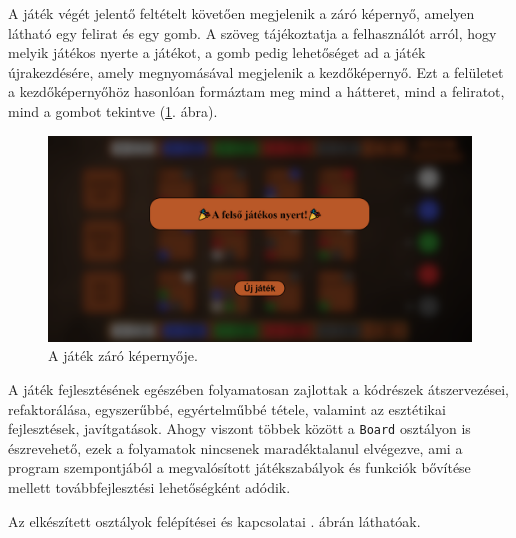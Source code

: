 
A játék végét jelentő feltételt követően megjelenik a záró képernyő, amelyen látható egy felirat és egy gomb. A szöveg tájékoztatja a felhasználót arról, hogy melyik játékos nyerte a játékot, a gomb pedig lehetőséget ad a játék újrakezdésére, amely megnyomásával megjelenik a kezdőképernyő. Ezt a felületet a kezdőképernyőhöz hasonlóan formáztam meg mind a hátteret, mind a feliratot, mind a gombot tekintve (\ref{fig:end_screen}. ábra).

\begin{figure}[h!]
\centering
\includegraphics[width=\textwidth]{images/end_screen.png}
\caption{A játék záró képernyője.}
\label{fig:end_screen}
\end{figure}


A játék fejlesztésének egészében folyamatosan zajlottak a kódrészek átszervezései, refaktorálása, egyszerűbbé, egyértelműbbé tétele, valamint az esztétikai fejlesztések, javítgatások. Ahogy viszont többek között a \texttt{Board} osztályon is észrevehető, ezek a folyamatok nincsenek maradéktalanul elvégezve, ami a program szempontjából a megvalósított játékszabályok és funkciók bővítése mellett továbbfejlesztési lehetőségként adódik.


Az elkészített osztályok felépítései és kapcsolatai . ábrán láthatóak.

